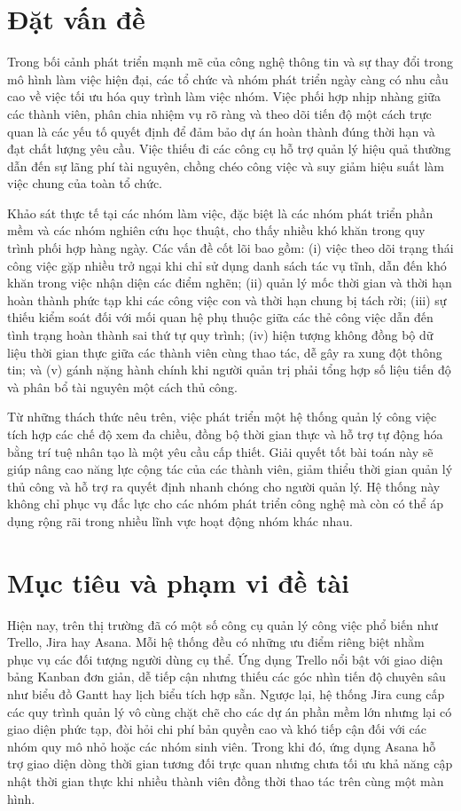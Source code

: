 \documentclass[../DoAn.tex]{subfiles}
\begin{document}
\section{Đặt vấn đề}
\label{section:1.1}
Trong bối cảnh phát triển mạnh mẽ của công nghệ thông tin và sự thay đổi trong mô hình làm việc hiện đại, các tổ chức và nhóm phát triển ngày càng có nhu cầu cao về việc tối ưu hóa quy trình làm việc nhóm. Việc phối hợp nhịp nhàng giữa các thành viên, phân chia nhiệm vụ rõ ràng và theo dõi tiến độ một cách trực quan là các yếu tố quyết định để đảm bảo dự án hoàn thành đúng thời hạn và đạt chất lượng yêu cầu. Việc thiếu đi các công cụ hỗ trợ quản lý hiệu quả thường dẫn đến sự lãng phí tài nguyên, chồng chéo công việc và suy giảm hiệu suất làm việc chung của toàn tổ chức.

Khảo sát thực tế tại các nhóm làm việc, đặc biệt là các nhóm phát triển phần mềm và các nhóm nghiên cứu học thuật, cho thấy nhiều khó khăn trong quy trình phối hợp hàng ngày. Các vấn đề cốt lõi bao gồm: (i) việc theo dõi trạng thái công việc gặp nhiều trở ngại khi chỉ sử dụng danh sách tác vụ tĩnh, dẫn đến khó khăn trong việc nhận diện các điểm nghẽn; (ii) quản lý mốc thời gian và thời hạn hoàn thành phức tạp khi các công việc con và thời hạn chung bị tách rời; (iii) sự thiếu kiểm soát đối với mối quan hệ phụ thuộc giữa các thẻ công việc dẫn đến tình trạng hoàn thành sai thứ tự quy trình; (iv) hiện tượng không đồng bộ dữ liệu thời gian thực giữa các thành viên cùng thao tác, dễ gây ra xung đột thông tin; và (v) gánh nặng hành chính khi người quản trị phải tổng hợp số liệu tiến độ và phân bổ tài nguyên một cách thủ công.

Từ những thách thức nêu trên, việc phát triển một hệ thống quản lý công việc tích hợp các chế độ xem đa chiều, đồng bộ thời gian thực và hỗ trợ tự động hóa bằng trí tuệ nhân tạo là một yêu cầu cấp thiết. Giải quyết tốt bài toán này sẽ giúp nâng cao năng lực cộng tác của các thành viên, giảm thiểu thời gian quản lý thủ công và hỗ trợ ra quyết định nhanh chóng cho người quản lý. Hệ thống này không chỉ phục vụ đắc lực cho các nhóm phát triển công nghệ mà còn có thể áp dụng rộng rãi trong nhiều lĩnh vực hoạt động nhóm khác nhau.

\section{Mục tiêu và phạm vi đề tài}
\label{section:1.2}
Hiện nay, trên thị trường đã có một số công cụ quản lý công việc phổ biến như Trello, Jira hay Asana. Mỗi hệ thống đều có những ưu điểm riêng biệt nhằm phục vụ các đối tượng người dùng cụ thể. Ứng dụng Trello nổi bật với giao diện bảng Kanban đơn giản, dễ tiếp cận nhưng thiếu các góc nhìn tiến độ chuyên sâu như biểu đồ Gantt hay lịch biểu tích hợp sẵn. Ngược lại, hệ thống Jira cung cấp các quy trình quản lý vô cùng chặt chẽ cho các dự án phần mềm lớn nhưng lại có giao diện phức tạp, đòi hỏi chi phí bản quyền cao và khó tiếp cận đối với các nhóm quy mô nhỏ hoặc các nhóm sinh viên. Trong khi đó, ứng dụng Asana hỗ trợ giao diện dòng thời gian tương đối trực quan nhưng chưa tối ưu khả năng cập nhật thời gian thực khi nhiều thành viên đồng thời thao tác trên cùng một màn hình.
\end{document}
